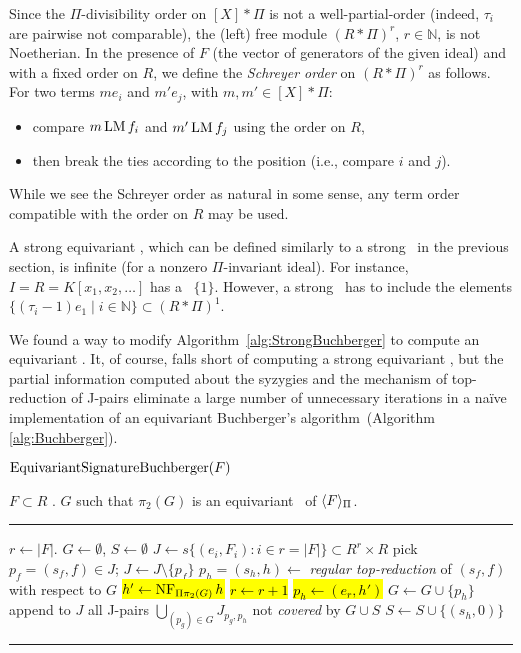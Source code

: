 Since the $\Pi$-divisibility order on $[X]*\Pi$ is not a well-partial-order (indeed, $\tau_i$ are pairwise not comparable), the (left) free module $(R*\Pi)^r$, $r\in\mathbb N$, is not Noetherian.  
In the presence of $F$ (the vector of generators of the given ideal) and with a fixed order on $R$, we define the \emph{Schreyer order} on $(R*\Pi)^r$ as follows. For two terms $me_i$ and $m'e_j$, with $m,m'\in [X]*\Pi$:
\begin{itemize}
\item compare $m\operatorname{LM} f_i$ and $m'\operatorname{LM} f_j$ using the order on $R$,
\item then break the ties according to the position (i.e., compare $i$ and $j$).
\end{itemize}
While we see the Schreyer order as natural in some sense, any term order compatible with the order on $R$ may be used. %

A strong equivariant \GB, which can be defined similarly to a strong \GB\ in the previous section, is infinite (for a nonzero $\Pi$-invariant ideal). 
For instance, $I = R = K[x_1,x_2,\ldots]$ has a \GB\ $\{1\}$.
However, a strong \GB\ has to include the elements $\{(\tau_i-1)e_1 \mid i\in\mathbb N \} \subset (R*\Pi)^1$. 

We found a way to modify Algorithm~\ref{alg:StrongBuchberger} to compute an equivariant \GB.  It, of course, falls short of computing a strong equivariant \GB, but the partial information computed about the syzygies and the mechanism of top-reduction of J-pairs eliminate a large number of unnecessary iterations in a na\"ive implementation of an equivariant Buchberger's algorithm~(Algorithm \ref{alg:Buchberger}).

\begin{algorithm}\label{alg:egb-signature}
$\operatorname{EquivariantSignatureBuchberger}(F)$

\begin{algorithmic}[1]
\REQUIRE $F\subset R$ .
\ENSURE $G$ such that $\pi_2(G)$ is an equivariant \GB\ of $\langle F \rangle_\Pi$.
\smallskip \hrule \smallskip
\STATE $r\gets |F|$.
\STATE $G\gets \emptyset$, $S\gets \emptyset$ 
\STATE $J\gets s\{(e_i,F_i):i\in r=|F|\} \subset R^r\times R$ 
	\STATE pick $p_f = (s_f,f) \in J$; $J\gets J\setminus\{p_f\}$
	\STATE $p_h=(s_h,h) \gets$ {\em regular top-reduction} of $(s_f,f)$ with respect to $G$
		\STATE \hl{$h' \gets\operatorname{NF}_{\Pi\pi_2(G)} h$}
				\STATE \hl{$r\gets r+1$}
				\STATE \hl{$p_h \gets (e_r,h')$}
			\ENDIF
			\STATE $G\gets G\cup \{p_h\}$
			\STATE append to $J$ all J-pairs $\bigcup_{(p_g)\in G}J_{p_g,p_h}$ not {\em covered} by $G \cup S$ 
		\ENDIF
        \ELSE 
                \STATE $S\gets S\cup\{(s_h,0)\}$
	\ENDIF
\ENDWHILE
\smallskip \hrule \smallskip
\end{algorithmic}
\end{algorithm}

